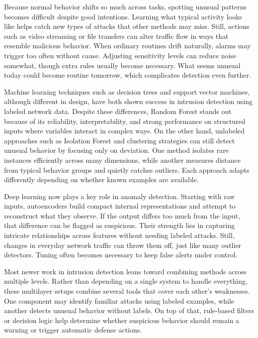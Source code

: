 \documentclass[conference]{IEEEtran}
\begin{document}
Because normal behavior shifts so much across tasks, spotting unusual patterns becomes difficult despite good intentions. Learning what typical activity looks like helps catch new types of attacks that other methods may miss. Still, actions such as video streaming or file transfers can alter traffic flow in ways that resemble malicious behavior. When ordinary routines drift naturally, alarms may trigger too often without cause. Adjusting sensitivity levels can reduce noise somewhat, though extra rules usually become necessary. What seems unusual today could become routine tomorrow, which complicates detection even further.

Machine learning techniques such as decision trees and support vector machines, although different in design, have both shown success in intrusion detection using labeled network data. Despite these differences, Random Forest stands out because of its reliability, interpretability, and strong performance on structured inputs where variables interact in complex ways. On the other hand, unlabeled approaches such as Isolation Forest and clustering strategies can still detect unusual behavior by focusing only on deviation. One method isolates rare instances efficiently across many dimensions, while another measures distance from typical behavior groups and quietly catches outliers. Each approach adapts differently depending on whether known examples are available.

Deep learning now plays a key role in anomaly detection. Starting with raw inputs, autoencoders build compact internal representations and attempt to reconstruct what they observe. If the output differs too much from the input, that difference can be flagged as suspicious. Their strength lies in capturing intricate relationships across features without needing labeled attacks. Still, changes in everyday network traffic can throw them off, just like many outlier detectors. Tuning often becomes necessary to keep false alerts under control.

Most newer work in intrusion detection leans toward combining methods across multiple levels. Rather than depending on a single system to handle everything, these multilayer setups combine several tools that cover each other's weaknesses. One component may identify familiar attacks using labeled examples, while another detects unusual behavior without labels. On top of that, rule-based filters or decision logic help determine whether suspicious behavior should remain a warning or trigger automatic defense actions.
\end{document}
